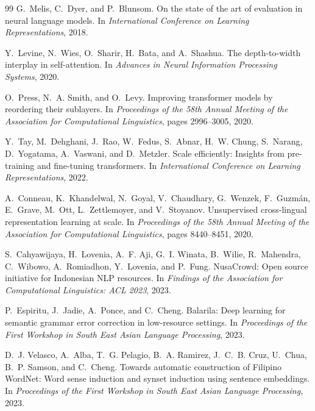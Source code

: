 \documentclass[11pt,a4paper]{article}
\begin{document}
\begin{thebibliography}{99}
G.~Melis, C.~Dyer, and P.~Blunsom.
\newblock On the state of the art of evaluation in neural language models.
\newblock In \emph{International Conference on Learning Representations}, 2018.

Y.~Levine, N.~Wies, O.~Sharir, H.~Bata, and A.~Shashua.
\newblock The depth-to-width interplay in self-attention.
\newblock In \emph{Advances in Neural Information Processing Systems}, 2020.

O.~Press, N.~A. Smith, and O.~Levy.
\newblock Improving transformer models by reordering their sublayers.
\newblock In \emph{Proceedings of the 58th Annual Meeting of the Association for Computational Linguistics}, pages 2996--3005, 2020.

Y.~Tay, M.~Dehghani, J.~Rao, W.~Fedus, S.~Abnar, H.~W. Chung, S.~Narang, D.~Yogatama, A.~Vaswani, and D.~Metzler.
\newblock Scale efficiently: Insights from pre-training and fine-tuning transformers.
\newblock In \emph{International Conference on Learning Representations}, 2022.

A.~Conneau, K.~Khandelwal, N.~Goyal, V.~Chaudhary, G.~Wenzek, F.~Guzm{\'a}n, E.~Grave, M.~Ott, L.~Zettlemoyer, and V.~Stoyanov.
\newblock Unsupervised cross-lingual representation learning at scale.
\newblock In \emph{Proceedings of the 58th Annual Meeting of the Association for Computational Linguistics}, pages 8440--8451, 2020.

S.~Cahyawijaya, H.~Lovenia, A.~F. Aji, G.~I. Winata, B.~Wilie, R.~Mahendra, C.~Wibowo, A.~Romiadhon, Y.~Lovenia, and P.~Fung.
\newblock NusaCrowd: Open source initiative for Indonesian NLP resources.
\newblock In \emph{Findings of the Association for Computational Linguistics: ACL 2023}, 2023.

P.~Espiritu, J.~Jadie, A.~Ponce, and C.~Cheng.
\newblock Balarila: Deep learning for semantic grammar error correction in low-resource settings.
\newblock In \emph{Proceedings of the First Workshop in South East Asian Language Processing}, 2023.

D.~J. Velasco, A.~Alba, T.~G. Pelagio, B.~A. Ramirez, J.~C.~B. Cruz, U.~Chua, B.~P. Samson, and C.~Cheng.
\newblock Towards automatic construction of Filipino WordNet: Word sense induction and synset induction using sentence embeddings.
\newblock In \emph{Proceedings of the First Workshop in South East Asian Language Processing}, 2023.


\end{thebibliography}
\end{document}
